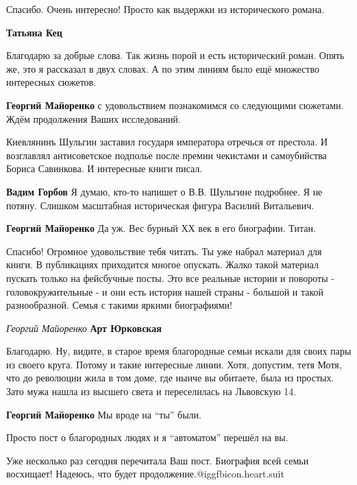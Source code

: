 \begin{itemize}
Спасибо. Очень интересно! Просто как выдержки из исторического романа.

\begin{itemize} %
\textbf{Татьяна Кец} 

Благодарю за добрые слова. Так жизнь порой и есть исторический роман. Опять же,
это я рассказал в двух словах. А по этим линиям было ещё множество интересных
сюжетов.


\textbf{Георгий Майоренко} с удовольствием познакомимся со следующими сюжетами. Ждём продолжения Ваших исследований.
\end{itemize} %


Киевлянинъ Шульгин заставил государя императора отречься от престола. И
возглавлял антисоветское подполье после премии чекистами и самоубийства Бориса
Савинкова. И интересные книги писал.

\begin{itemize} %
\textbf{Вадим Горбов} Я думаю, кто-то напишет о В.В. Шульгине подробнее. Я не потяну. Слишком масштабная историческая фигура Василий Витальевич.

\textbf{Георгий Майоренко} Да уж. Вес бурный ХХ век в его биографии. Титан.
\end{itemize} %


Спасибо! Огромное удовольствие тебя читать. Ты уже набрал материал для книги. В
публикациях приходится многое опускать. Жалко такой материал пускать только на
фейсбучные посты. Это все реальные истории и повороты - головокружительные - и
они есть история нашей страны - большой и такой разнообразной. Семья с такими
яркими биографиями!

\begin{itemize} %
\emph{Георгий Майоренко}
\textbf{Арт Юрковская} 

Благодарю. Ну, видите, в старое время благородные семьи искали для своих пары
из своего круга. Потому и такие интересные линии. Хотя, допустим, тетя Мотя,
что до революции жила в том доме, где нынче вы обитаете, была из простых. Зато
мужа нашла из высшего света и переселилась на Львовскую 14.

\begin{itemize} %
\textbf{Георгий Майоренко} Мы вроде на \enquote{ты} были.

Просто пост о благородных людях и я \enquote{автоматом} перешёл на вы.
\end{itemize} %

\end{itemize} %


Уже несколько раз сегодня перечитала Ваш пост. Биография всей семьи
восхищает! Надеюсь, что будет продолжение.@igg{fbicon.heart.suit}

\end{itemize} %
